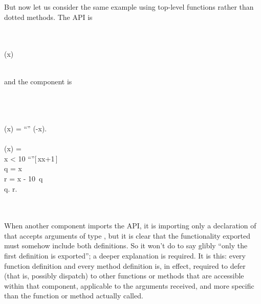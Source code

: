 But now let us consider the same example using top-level
functions rather than dotted methods.  The API is
\begin{codeexamplesize}
\begin{FortressCode}
\:  \\
 \\
(x\COLON {})\COLON {} \\
 \\
 
\end{FortressCode}
\end{codeexamplesize}
and the component is
\begin{codeexamplesize}
\begin{FortressCode}
  \\
  \\
 \\
(x\COLON {}) = \hbox{\rm{}``\STR{{-}}''} \mathrel{\Vert} (-x). \\
 \\
(x\COLON {}) = \\
\2\+ x < 10  \hbox{\rm{}``''}[\,x\COLONOP{}x+1\,]  \\
  \2\+q = x  \\
    r = x - 10\, q \\
    q. \mathrel{\Vert} r.\- \\
   \\
\- \\
 
\end{FortressCode}
\end{codeexamplesize}
When another component imports the API, it is importing
only a declaration of  that accepts arguments
of type , but it is clear that the functionality
exported must somehow include both definitions.
So it won't do to say glibly ``only the first definition
is exported''; a deeper explanation is required.
It is this: every function definition and every method definition is, in effect,
required to defer (that is, possibly dispatch) to other functions or methods
that are accessible within that component, applicable to the arguments received,
and more specific than the function or method actually called.

